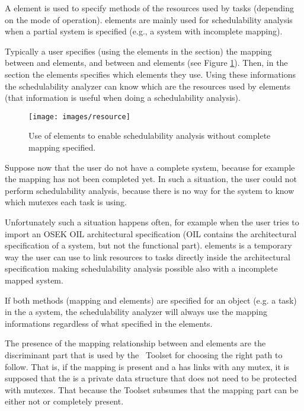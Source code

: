 A  element is used to specify methods of the resources
used by tasks (depending on the mode of operation). 
elements are mainly used for schedulability analysis when a partial
system is specified (e.g., a system with incomplete mapping).

Typically a user specifies (using the elements in the 
section) the mapping between  and  elements,
and between  and  elements (see Figure
\ref{fig:RESOURCE}).  Then, in the  section the
 elements specifies which  elements they
use. Using these informations the schedulability analyzer can know
which are the resources used by  elements (that
information is useful when doing a schedulability analysis).

\begin{figure}
  \texttt{[image: images/resource]}
  \caption{Use of  elements to enable schedulability
    analysis without complete mapping specified.}
  \label{fig:RESOURCE}
\end{figure}


Suppose now that the user do not have a complete system, because for
example the mapping has not been completed yet. In such a situation,
the user could not perform schedulability analysis, because there is
no way for the system to know which mutexes each task is using.

Unfortunately such a situation happens often, for example when the
user tries to import an OSEK OIL architectural specification (OIL
contains the architectural specification of a system, but not the
functional part).  elements is a temporary way the
user can use to link resources to tasks directly inside the
architectural specification making schedulability analysis possible
also with a incomplete mapped system.

If both methods (mapping and  elements) are specified
for an object (e.g. a task) in the a system, the schedulability
analyzer will always use the mapping informations regardless of what
specified in the  elements.

The presence of the mapping relationship between  and
 elements are the discriminant part that is used by the
\rtd\ Toolset for choosing the right path to follow. That is, if the
mapping is present and a  has links with any mutex, it is
supposed that the  is a private data structure that does
not need to be protected with mutexes. That because the Toolset
subsumes that the mapping part can be either not or completely
present.

